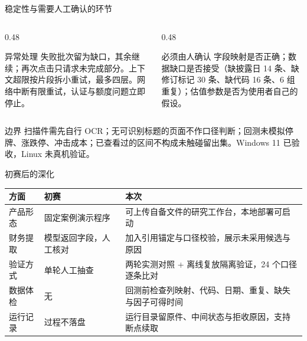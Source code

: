 \documentclass[aspectratio=169,11pt]{ctexbeamer}
\begin{document}
\begin{frame}{稳定性与需要人工确认的环节}
\vspace{0.2cm}
\begin{columns}[T,onlytextwidth]
\begin{column}{0.48\textwidth}
\begin{block}{异常处理}
失败批次留为缺口，其余继续；再次点击只请求未完成部分。上下文超限按片段拆小重试，最多四层。网络中断有限重试，认证与额度问题立即停止。
\end{block}
\end{column}
\begin{column}{0.48\textwidth}
\begin{block}{必须由人确认}
字段映射是否正确；数据缺口是否接受（缺披露日 14 条、缺修订标记 30 条、缺代码 16 条、6 组重复）；估值参数是否为使用者自己的假设。
\end{block}
\end{column}
\end{columns}

\vspace{0.4cm}
\begin{alertblock}{边界}
扫描件需先自行 OCR；无可识别标题的页面不作口径判断；回测未模拟停牌、涨跌停、冲击成本；已查看过的区间不构成未触碰留出集。Windows 11 已验收，Linux 未真机验证。
\end{alertblock}
\end{frame}

\begin{frame}{初赛后的深化}
\vspace{0.15cm}
\small
\begin{tabularx}{\textwidth}{@{}p{}X X@{}}
\toprule
\bfseries 方面 & \bfseries 初赛 & \bfseries 本次 \\
\midrule
产品形态 & 固定案例演示程序 & 可上传自备文件的研究工作台，本地部署可启动 \\
财务提取 & 模型返回字段，人工核对 & 加入引用锚定与口径校验，展示未采用候选与原因 \\
验证方式 & 单轮人工抽查 & 两轮实测对照 + 离线复放隔离验证，24 个口径逐条比对 \\
数据体检 & 无 & 回测前检查列映射、代码、日期、重复、缺失与因子可得时间 \\
运行记录 & 过程不落盘 & 运行目录留原件、中间状态与拒收原因，支持断点续取 \\
\bottomrule
\end{tabularx}
\end{frame}
\end{document}
